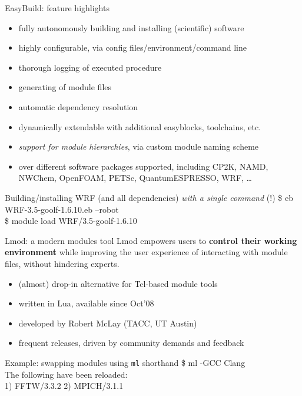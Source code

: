 \documentclass[10pt,xcolor={usenames,dvipsnames}]{beamer}
\begin{document}

\begin{frame}{EasyBuild: feature highlights}
    \begin{itemize}
        \item fully autonomously building and installing (scientific) software
        \item highly configurable, via config files/environment/command line
        \item thorough logging of executed procedure
        \item generating of module files
        \item automatic dependency resolution
        \item dynamically extendable with additional easyblocks, toolchains, etc.
        \item \emph{support for module hierarchies}, via custom module naming scheme
        \item over different software packages supported, including
              CP2K, NAMD, NWChem, OpenFOAM, PETSc, QuantumESPRESSO, WRF, \ldots
    \end{itemize}
    \begin{exampleblock}{Building/installing WRF (and all dependencies) \emph{with a single command} (!)}
        \ttfamily
        \$ eb WRF-3.5-goolf-1.6.10.eb --robot\\
        \$ module load WRF/3.5-goolf-1.6.10
    \end{exampleblock}
\end{frame}


\begin{frame}{Lmod: a modern modules tool}
    Lmod empowers users to \textbf{control their working environment} while improving the user
    experience of interacting with module files, without hindering experts.
    \begin{itemize}
        \item \small{(almost)} drop-in alternative for Tcl-based module tools
        \item written in Lua, available since Oct'08
        \item developed by Robert McLay (TACC, UT Austin)
        \item frequent releases, driven by community demands and feedback
    \end{itemize}
    \begin{exampleblock}{Example: swapping modules using \texttt{ml} shorthand}
        \ttfamily
        \$ ml -GCC Clang\\
        The following have been reloaded:\\
        1) FFTW/3.3.2 2) MPICH/3.1.1
    \end{exampleblock}
\end{frame}
\end{document}
